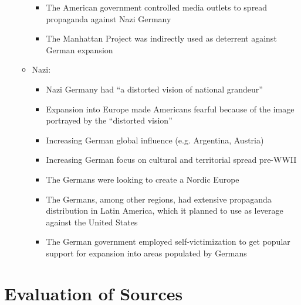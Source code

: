 \documentclass[a4paper,12pt]{article}
\begin{document}
\begin{itemize}
\begin{itemize}
                \begin{itemize}
                    \item The American government controlled media outlets to spread propaganda against Nazi Germany \cite[2]{lauriec}
                    \item The Manhattan Project was indirectly used as deterrent against German expansion \cite[140]{grovesl}
                \end{itemize}
                \item Nazi:
                \begin{itemize}
                    \item Nazi Germany had ``a distorted vision of national grandeur'' \cite[37]{kallisa}
                    \item Expansion into Europe made Americans fearful because of the image portrayed by the ``distorted vision'' \cite[37]{kallisa}
                    \item Increasing German global influence (e.g. Argentina, Austria) \cite[2]{pyensonl}
                    \item Increasing German focus on cultural and territorial spread pre-WWII \cite[17]{pyensonl}
                    \item The Germans were looking to create a Nordic Europe \cite[192]{guettelj}
                    \item The Germans, among other regions, had extensive propaganda distribution in Latin America, which it planned to use as leverage against the United States \cite[59]{krise}
                    \item The German government employed self-victimization to get popular support for expansion into areas populated by Germans \cite[1]{bergend}
                \end{itemize}
            \end{itemize}
        \end{itemize}


    \section{Evaluation of Sources} %
    
\end{document}
